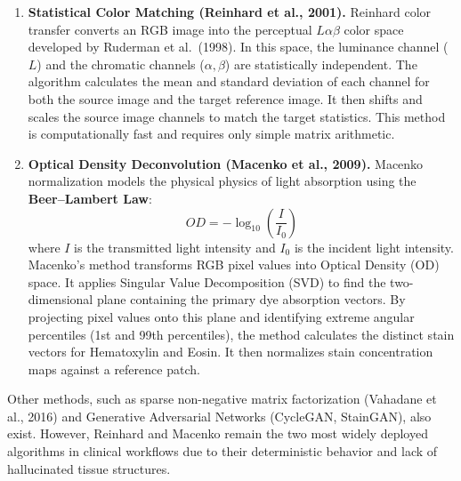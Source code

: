 \documentclass[11pt,a4paper]{article}
\begin{document}
\begin{enumerate}
  \item \textbf{Statistical Color Matching (Reinhard et al., 2001).}
        Reinhard color transfer converts an RGB image into the perceptual
        $L\alpha\beta$ color space developed by Ruderman et al.\ (1998). In this
        space, the luminance channel ($L$) and the chromatic channels
        ($\alpha, \beta$) are statistically independent. The algorithm calculates the
        mean and standard deviation of each channel for both the source image and the
        target reference image. It then shifts and scales the source image channels to
        match the target statistics. This method is computationally fast and requires
        only simple matrix arithmetic.

  \item \textbf{Optical Density Deconvolution (Macenko et al., 2009).}
        Macenko normalization models the physical physics of light absorption using
        the \textbf{Beer--Lambert Law}:
        \begin{equation}
          OD = -\log_{10}\!\left(\frac{I}{I_0}\right)
        \end{equation}
        where $I$ is the transmitted light intensity and $I_0$ is the incident light
        intensity. Macenko's method transforms RGB pixel values into Optical Density
        (OD) space. It applies Singular Value Decomposition (SVD) to find the
        two-dimensional plane containing the primary dye absorption vectors. By
        projecting pixel values onto this plane and identifying extreme angular
        percentiles (1st and 99th percentiles), the method calculates the distinct
        stain vectors for Hematoxylin and Eosin. It then normalizes stain
        concentration maps against a reference patch.
\end{enumerate}

Other methods, such as sparse non-negative matrix factorization (Vahadane et al.,
2016) and Generative Adversarial Networks (CycleGAN, StainGAN), also exist. However,
Reinhard and Macenko remain the two most widely deployed algorithms in clinical
workflows due to their deterministic behavior and lack of hallucinated tissue
structures.
\end{document}
